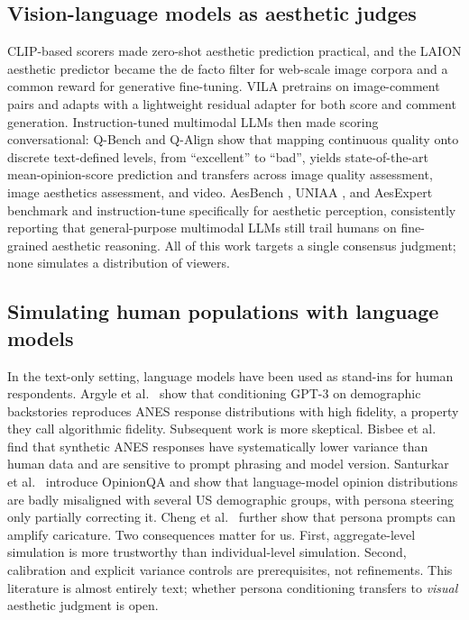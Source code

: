 \documentclass[10pt,twocolumn,letterpaper]{article}
\begin{document}
\subsection{Vision-language models as aesthetic judges}
CLIP-based scorers made zero-shot aesthetic prediction practical, and the LAION aesthetic predictor \citep{schuhmann2022} became the de facto filter for web-scale image corpora and a common reward for generative fine-tuning. VILA \citep{ke2023vila} pretrains on image-comment pairs and adapts with a lightweight residual adapter for both score and comment generation. Instruction-tuned multimodal LLMs then made scoring conversational: Q-Bench \citep{wu2024qbench} and Q-Align \citep{wu2024qalign} show that mapping continuous quality onto discrete text-defined levels, from ``excellent'' to ``bad'', yields state-of-the-art mean-opinion-score prediction and transfers across image quality assessment, image aesthetics assessment, and video. AesBench \citep{huang2024aesbench}, UNIAA \citep{zhou2024uniaa}, and AesExpert \citep{huang2024aesexpert} benchmark and instruction-tune specifically for aesthetic perception, consistently reporting that general-purpose multimodal LLMs still trail humans on fine-grained aesthetic reasoning. All of this work targets a single consensus judgment; none simulates a distribution of viewers.

\subsection{Simulating human populations with language models}
In the text-only setting, language models have been used as stand-ins for human respondents. Argyle et al.\ \citep{argyle2023} show that conditioning GPT-3 on demographic backstories reproduces ANES response distributions with high fidelity, a property they call algorithmic fidelity. Subsequent work is more skeptical. Bisbee et al.\ \citep{bisbee2024synthetic} find that synthetic ANES responses have systematically lower variance than human data and are sensitive to prompt phrasing and model version. Santurkar et al.\ \citep{santurkar2023whose} introduce OpinionQA and show that language-model opinion distributions are badly misaligned with several US demographic groups, with persona steering only partially correcting it. Cheng et al.\ \citep{cheng2023compost} further show that persona prompts can amplify caricature. Two consequences matter for us. First, aggregate-level simulation is more trustworthy than individual-level simulation. Second, calibration and explicit variance controls are prerequisites, not refinements. This literature is almost entirely text; whether persona conditioning transfers to \emph{visual} aesthetic judgment is open.
\end{document}
